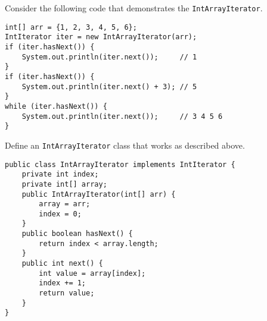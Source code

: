 \begin{blocksection}
\question Consider the following code that demonstrates the
\lstinline$IntArrayIterator$.

\begin{lstlisting}
int[] arr = {1, 2, 3, 4, 5, 6};
IntIterator iter = new IntArrayIterator(arr);
if (iter.hasNext()) {
    System.out.println(iter.next());     // 1
}
if (iter.hasNext()) {
    System.out.println(iter.next() + 3); // 5
}
while (iter.hasNext()) {
    System.out.println(iter.next());     // 3 4 5 6
}
\end{lstlisting}

Define an \lstinline$IntArrayIterator$ class that works as described above.

\begin{solution}[3in]
\begin{lstlisting}
public class IntArrayIterator implements IntIterator {
    private int index;
    private int[] array;
    public IntArrayIterator(int[] arr) {
        array = arr;
        index = 0;
    }
    public boolean hasNext() {
        return index < array.length;
    }
    public int next() {
        int value = array[index];
        index += 1;
        return value;
    }
}
\end{lstlisting}
\end{solution}
\end{blocksection}
